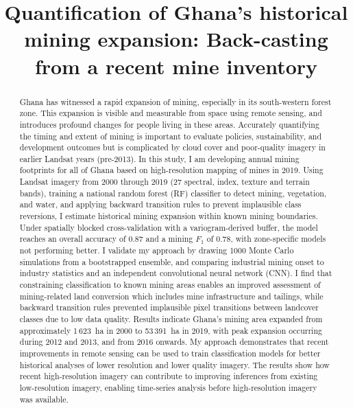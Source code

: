 \documentclass[]{interact}
\begin{document}
\title{Quantification of Ghana's historical mining expansion: Back-casting from a recent mine inventory}

\author{
}

\maketitle

\begin{abstract}
Ghana has witnessed a rapid expansion of mining, especially in its
south-western forest zone. This expansion is visible and measurable from
space using remote sensing, and introduces profound changes for people
living in these areas. Accurately quantifying the timing and extent of
mining is important to evaluate policies, sustainability, and
development outcomes but is complicated by cloud cover and poor-quality imagery
in earlier Landsat years (pre-2013). In this study, I am developing annual mining
footprints for all of Ghana based on high-resolution mapping of mines in 2019.
Using Landsat imagery from 2000 through 2019 (27 spectral, index, texture and
terrain bands), training a national random forest (RF) classifier to detect mining,
vegetation, and water, and applying backward transition rules to prevent implausible
class reversions, I estimate historical mining expansion within known mining boundaries.
Under spatially blocked cross-validation with a variogram-derived buffer, the model reaches
an overall accuracy of 0.87 and a mining $F_1$ of 0.78, with zone-specific models not performing better.
I validate my approach by drawing 1000 Monte Carlo simulations from a bootstrapped ensemble,
and comparing industrial mining onset to industry statistics and an independent convolutional
neural network (CNN). I find that constraining classification to known mining areas enables
an improved assessment of mining-related land conversion which includes mine infrastructure
and tailings, while backward transition rules prevented implausible pixel transitions between landcover
classes due to low data quality. Results indicate Ghana's mining area expanded
from approximately 1\,623~ha in 2000 to 53\,391~ha in 2019, with peak expansion
occurring during 2012 and 2013, and from 2016 onwards. My approach demonstrates that recent improvements
in remote sensing can be used to train classification models for better historical analyses of
lower resolution and lower quality imagery. The results show how recent high-resolution imagery
can contribute to improving inferences from existing low-resolution imagery, enabling time-series analysis before
high-resolution imagery was available.
\end{abstract}
\end{document}
